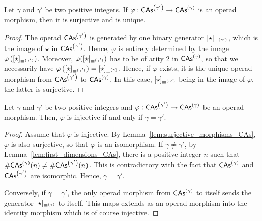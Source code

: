\begin{Lemma} \label{lem:surjective_morphisms_CAs}
    Let $\gamma$ and $\gamma'$ be two positive integers. If
    $\varphi:\mathsf{CAs}^{\left(\gamma'\right)} \to \mathsf{CAs}^{\left(\gamma\right)}$ is an operad morphism, then
    it is surjective and is unique.
\end{Lemma}
\begin{proof}
    The operad $\mathsf{CAs}^{\left(\gamma'\right)}$ is generated by one binary generator
    $[\operatorname{\star}]_{\operatorname{\equiv}^{(\gamma')}}$, which is the image of $\operatorname{\star}$
    in $\mathsf{CAs}^{\left(\gamma'\right)}$. Hence, $\varphi$ is entirely determined by the
    image $\varphi\left([\operatorname{\star}]_{\operatorname{\equiv}^{(\gamma')}}\right)$.
    Moreover, $\varphi([\operatorname{\star}]_{\operatorname{\equiv}^{(\gamma')}})$ has to be of
    arity $2$ in $\mathsf{CAs}^{\left(\gamma\right)}$, so that we necessarily have
    \begin{math}
        \varphi\left([\operatorname{\star}]_{\operatorname{\equiv}^{(\gamma')}}\right)
        =
        [\operatorname{\star}]_{\operatorname{\equiv}^{(\gamma)}}.
    \end{math}
    Hence, if $\varphi$ exists, it is the unique operad morphism from
    $\mathsf{CAs}^{\left(\gamma'\right)}$ to $\mathsf{CAs}^{\left(\gamma\right)}$. In this case,
    $[\operatorname{\star}]_{\operatorname{\equiv}^{(\gamma')}}$ being in the image of $\varphi$,
    the latter is surjective.
\end{proof}
\medbreak

\begin{Lemma} \label{lem:injective_morphisms_CAs}
    Let $\gamma$ and $\gamma'$ be two positive integers and
    $\varphi:\mathsf{CAs}^{\left(\gamma'\right)} \to \mathsf{CAs}^{\left(\gamma\right)}$ be an operad morphism.
    Then, $\varphi$ is injective if and only if $\gamma = \gamma'$.
\end{Lemma}
\begin{proof}
    Assume that $\varphi$ is injective. By
    Lemma~\ref{lem:surjective_morphisms_CAs}, $\varphi$ is also
    surjective, so that $\varphi$ is an isomorphism. If
    $\gamma \ne \gamma'$, by Lemma~\ref{lem:first_dimensions_CAs}, there
    is a positive integer $n$ such that
    $\# \mathsf{CAs}^{\left(\gamma\right)}(n) \ne \# \mathsf{CAs}^{\left(\gamma'\right)}(n)$. This is contradictory
    with the fact that $\mathsf{CAs}^{\left(\gamma\right)}$ and $\mathsf{CAs}^{\left(\gamma'\right)}$ are
    isomorphic. Hence, $\gamma = \gamma'$.
    \smallbreak

    Conversely, if $\gamma = \gamma'$, the only operad morphism from
    $\mathsf{CAs}^{\left(\gamma\right)}$ to itself sends the generator
    $[\operatorname{\star}]_{\operatorname{\equiv}^{(\gamma)}}$ to itself. This maps extends as
    an operad morphism into the identity morphism which is of course
    injective.
\end{proof}
\medbreak

